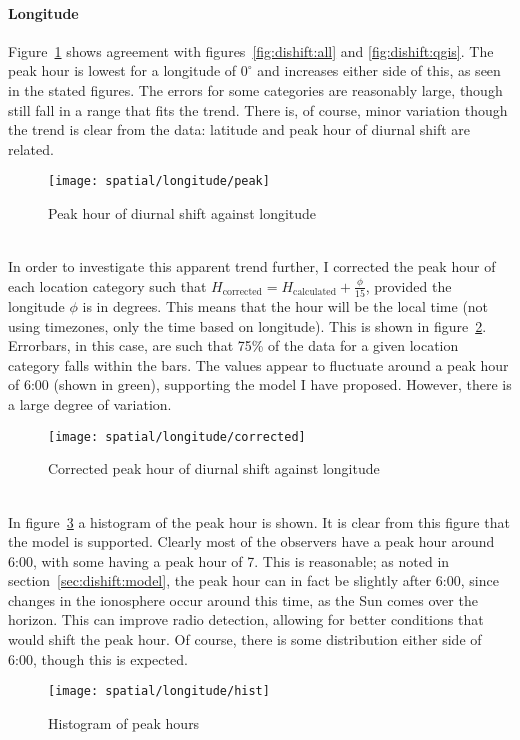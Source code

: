 \paragraph{Longitude\\}
Figure~\ref{fig:dishift:lon:peak} shows agreement with figures~\ref{fig:dishift:all} and \ref{fig:dishift:qgis}. The peak hour is lowest for a longitude of $0^{\circ}$ and increases either side of this, as seen in the stated figures. The errors for some categories are reasonably large, though still fall in a range that fits the trend. There is, of course, minor variation though the trend is clear from the data: latitude and peak hour of diurnal shift are related.
\begin{figure}[h!]
	\centering
	\texttt{[image: spatial/longitude/peak]}
	\caption{Peak hour of diurnal shift against longitude
		\label{fig:dishift:lon:peak}}
\end{figure}\\
In order to investigate this apparent trend further, I corrected the peak hour of each location category such that $H_{\text{corrected}} = H_{\text{calculated}} + \frac{\phi}{15}$, provided the longitude $\phi$ is in degrees. This means that the hour will be the local time (not using timezones, only the time based on longitude). This is shown in figure~\ref{fig:dishift:lon:corrected}. Errorbars, in this case, are such that 75\% of the data for a given location category falls within the bars. The values appear to fluctuate around a peak hour of 6:00 (shown in green), supporting the model I have proposed. However, there is a large degree of variation.
\begin{figure}[h!]
	\centering
	\texttt{[image: spatial/longitude/corrected]}
	\caption{Corrected peak hour of diurnal shift against longitude
		\label{fig:dishift:lon:corrected}}
\end{figure}\\
In figure~\ref{fig:dishift:lon:hist} a histogram of the peak hour is shown. It is clear from this figure that the model is supported. Clearly most of the observers have a peak hour around 6:00, with some having a peak hour of 7. This is reasonable; as noted in section~\ref{sec:dishift:model}, the peak hour can in fact be slightly after 6:00, since changes in the ionosphere occur around this time, as the Sun comes over the horizon. This can improve radio detection, allowing for better conditions that would shift the peak hour. Of course, there is some distribution either side of 6:00, though this is expected.
\begin{figure}[h!]
	\centering
	\texttt{[image: spatial/longitude/hist]}
	\caption{Histogram of peak hours
		\label{fig:dishift:lon:hist}}
\end{figure}

